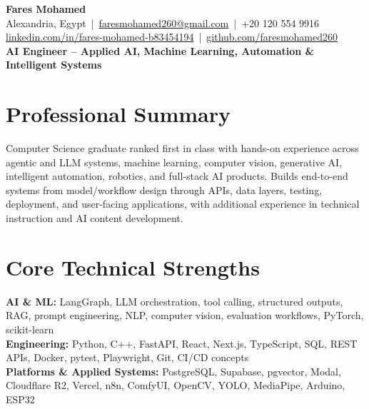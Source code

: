 \documentclass[letterpaper]{article}
\begin{document}
\small
\begin{center}
{\LARGE \textbf{Fares Mohamed}}\\[3pt]
Alexandria, Egypt \,|\, \href{mailto:faresmohamed260@gmail.com}{faresmohamed260@gmail.com} \,|\, +20 120 554 9916\\
\href{https://www.linkedin.com/in/fares-mohamed-b83454194/}{linkedin.com/in/fares-mohamed-b83454194} \,|\, \href{https://github.com/faresmohamed260}{github.com/faresmohamed260}\\
\textbf{AI Engineer -- Applied AI, Machine Learning, Automation \& Intelligent Systems}
\end{center}

\section*{Professional Summary}
Computer Science graduate ranked first in class with hands-on experience across agentic and LLM systems, machine learning, computer vision, generative AI, intelligent automation, robotics, and full-stack AI products. Builds end-to-end systems from model/workflow design through APIs, data layers, testing, deployment, and user-facing applications, with additional experience in technical instruction and AI content development.

\section*{Core Technical Strengths}
\textbf{AI \& ML:} LangGraph, LLM orchestration, tool calling, structured outputs, RAG, prompt engineering, NLP, computer vision, evaluation workflows, PyTorch, scikit-learn\\
\textbf{Engineering:} Python, C++, FastAPI, React, Next.js, TypeScript, SQL, REST APIs, Docker, pytest, Playwright, Git, CI/CD concepts\\
\textbf{Platforms \& Applied Systems:} PostgreSQL, Supabase, pgvector, Modal, Cloudflare R2, Vercel, n8n, ComfyUI, OpenCV, YOLO, MediaPipe, Arduino, ESP32
\end{document}
